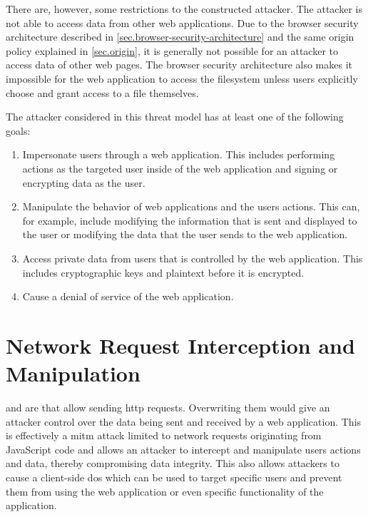 There are, however, some restrictions to the constructed attacker. The attacker is not able to access data from other web applications. Due to the browser security architecture described in \autoref{sec.browser-security-architecture} and the same origin policy explained in \autoref{sec.origin}, it is generally not possible for an attacker to access data of other web pages. The browser security architecture also makes it impossible for the web application to access the filesystem unless users explicitly choose and grant access to a file themselves.

The attacker considered in this threat model has at least one of the following goals:

\begin{enumerate}
    \item Impersonate users through a web application. This includes performing actions as the targeted user inside of the web application and signing or encrypting data as the user.
    \item Manipulate the behavior of web applications and the users actions. This can, for example, include modifying the information that is sent and displayed to the user or modifying the data that the user sends to the web application.
    \item Access private data from users that is controlled by the web application. This includes cryptographic keys and plaintext before it is encrypted.
    \item Cause a denial of service of the web application.
\end{enumerate}



\section{Network Request Interception and Manipulation}
\label{sec.threats.requestinterception}

 and  are \browserAPIs{} that allow sending \acs{http} requests. Overwriting them would give an attacker control over the data being sent and received by a web application. This is effectively a \ac{mitm} attack limited to network requests originating from JavaScript code and allows an attacker to intercept and manipulate users actions and data, thereby compromising data integrity. This also allows attackers to cause a client-side \ac{dos} which can be used to target specific users and prevent them from using the web application or even specific functionality of the application.

